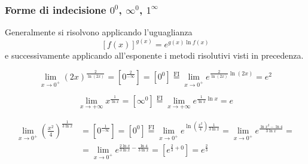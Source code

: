 \subsubsection{Forme di indecisione $0^0$, $\infty^0$, $1^\infty$}
Generalmente si risolvono applicando l'uguaglianza \[\left[f(x)\right]^{g(x)}=e^{g(x)\ln f(x)}\]
e successivamente applicando all'esponente i metodi risolutivi visti in precedenza.
\begin{ex}
\[\lim_{x\to0^+}(2x)^{\frac{2}{\ln(2x)}}=\left[0^\frac{2}{-\infty}\right]=\left[0^0\right]\overset{\mathrm{FI}}{=}\lim_{x\to0^+}e^{\frac{2}{\ln(2x)}\ln(2x)}=e^2\]
\end{ex}
\begin{ex}
\[\lim_{x\to+\infty}x^\frac{1}{\ln x}=\left[\infty^0\right]\overset{\mathrm{FI}}{=}\lim_{x\to+\infty}e^{\frac{1}{\ln x}\ln x}=e\]
\end{ex}
\begin{ex}
\[\begin{aligned}\lim_{x\to 0^+}\left(\frac{x^2}{4}\right)^\frac{1}{3\ln x}&=\left[0^\frac{1}{-\infty}\right]=\left[0^0\right]\overset{\mathrm{FI}}{=}\lim_{x\to0^+}e^{\ln\left(\frac{x^2}{4}\right)\frac{1}{3\ln x}}=\lim_{x\to0^+}e^{\frac{\ln x^2-\ln4}{3\ln x}} =\\&=\lim_{x\to0^+}e^{\frac{2\ln x}{3\ln x}-\frac{\ln4}{3\ln x}}=\left[e^{\frac{2}{3}+0}\right]=e^\frac{2}{3}\end{aligned}\]
\end{ex}

